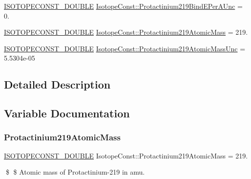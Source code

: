 \begin{DoxyCompactItemize}
\item 
\mbox{\hyperlink{group___isotope_const-_macros_ga8f45a7272ce02c0b4c65c44636ed719a}{I\+S\+O\+T\+O\+P\+E\+C\+O\+N\+S\+T\+\_\+\+D\+O\+U\+B\+LE}} \mbox{\hyperlink{group___isotope_const-_protactinium-_pa219_ga706fc8ea10a1dd78fbe6ef092d186d63}{Isotope\+Const\+::\+Protactinium219\+Bind\+E\+Per\+A\+Unc}} = 0.
\item 
\mbox{\hyperlink{group___isotope_const-_macros_ga8f45a7272ce02c0b4c65c44636ed719a}{I\+S\+O\+T\+O\+P\+E\+C\+O\+N\+S\+T\+\_\+\+D\+O\+U\+B\+LE}} \mbox{\hyperlink{group___isotope_const-_protactinium-_pa219_ga653e39f3e934a71b20227c02772bbe28}{Isotope\+Const\+::\+Protactinium219\+Atomic\+Mass}} = 219.
\item 
\mbox{\hyperlink{group___isotope_const-_macros_ga8f45a7272ce02c0b4c65c44636ed719a}{I\+S\+O\+T\+O\+P\+E\+C\+O\+N\+S\+T\+\_\+\+D\+O\+U\+B\+LE}} \mbox{\hyperlink{group___isotope_const-_protactinium-_pa219_ga920cab462122d01959498916aea295dc}{Isotope\+Const\+::\+Protactinium219\+Atomic\+Mass\+Unc}} = 5.\+5304e-\/05
\end{DoxyCompactItemize}


\subsection{Detailed Description}


\subsection{Variable Documentation}
\mbox{\label{group___isotope_const-_protactinium-_pa219_ga653e39f3e934a71b20227c02772bbe28}} 
\subsubsection{\texorpdfstring{Protactinium219\+Atomic\+Mass}{Protactinium219AtomicMass}}
{\footnotesize\ttfamily \mbox{\hyperlink{group___isotope_const-_macros_ga8f45a7272ce02c0b4c65c44636ed719a}{I\+S\+O\+T\+O\+P\+E\+C\+O\+N\+S\+T\+\_\+\+D\+O\+U\+B\+LE}} Isotope\+Const\+::\+Protactinium219\+Atomic\+Mass = 219.}

\$ \$ Atomic mass of Protactinium-\/219 in amu. \mbox{\label{group___isotope_const-_protactinium-_pa219_ga920cab462122d01959498916aea295dc}} 
